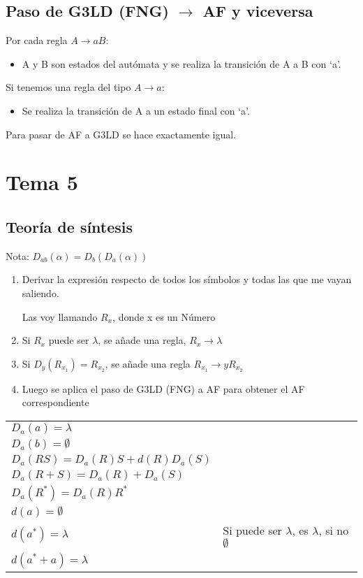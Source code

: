 \documentclass[12pt, twoside, openright]{report} %
\begin{document}
\subsection{Paso de G3LD (FNG) $\boldsymbol{\rightarrow}$ AF y viceversa}
Por cada regla $A \rightarrow aB$:
\begin{itemize}
	\item A y B son estados del autómata y se realiza la transición de A a B con ‘a’.
\end{itemize}
Si tenemos una regla del tipo $A \rightarrow a$:
\begin{itemize}
	\item Se realiza la transición de A a un estado final con ‘a’.
\end{itemize}
Para pasar de AF a G3LD se hace exactamente igual.

\section{Tema 5}
\subsection{Teoría de síntesis}
Nota: $D_{ab}(\alpha)= D_b(D_a(\alpha))$
\begin{enumerate}
	\item Derivar la expresión respecto de todos los símbolos y todas las que me vayan saliendo.

	      Las voy llamando $R_x$, donde x es un Número
	\item Si $R_x$ puede ser $\lambda$, se añade una regla, $R_x \rightarrow \lambda$
	\item Si $D_y(R_{x_1}) = R_{x_2}$, se añade una regla $R_{x_1} \rightarrow y R_{x_2}$
	\item Luego se aplica el paso de G3LD (FNG) a AF para obtener el AF correspondiente
\end{enumerate}
\begin{table}[H]
	\centering\begin{tabular}{ll}
		$D_a(a) = \lambda$ \\
		$D_a(b) = \emptyset$ \\
		$D_a(RS) = D_a(R)S + d(R)D_a(S)$ \\
		$D_a(R+S) = D_a(R) + D_a(S)$ \\
		$D_a(R^*) = D_a(R)R^*$ \\
		$d(a) = \emptyset$ \\
		$d(a^*) = \lambda$ & Si puede ser $\lambda$, es $\lambda$, si no $\emptyset$ \\
		$d(a^*+a) = \lambda$ \\
	\end{tabular}
\end{table}
\end{document}
